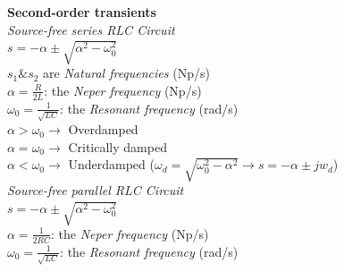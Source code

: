 \documentclass[twocolumn]{tudelft}
\begin{document}
\textbf{Second-order transients}\\
\textit{Source-free series RLC Circuit} \\
$\displaystyle s  = - \alpha \pm \sqrt{\alpha^2 - \omega_0^2}$ \\
$s_1 \& s_2$ are \textit{Natural frequencies} (\si{Np/s}) \\
$\displaystyle \alpha = \frac{R}{2L}$: the \textit{Neper frequency} (\si{Np/s}) \\
$\displaystyle \omega_0 = \frac{1}{\sqrt{LC}}$: the \textit{Resonant frequency} (\si{rad/s})\\ 
$\alpha > \omega_0 \to $ Overdamped\\
$\alpha = \omega_0 \to $ Critically damped\\
$\alpha < \omega_0 \to $ Underdamped ($\omega_d = \sqrt{\omega_0^2 - \alpha^2} \to s = -\alpha \pm jw_d$)\\

\textit{Source-free parallel RLC Circuit} \\
$\displaystyle s  = - \alpha \pm \sqrt{\alpha^2 - \omega_0^2}$ \\
$\displaystyle \alpha = \frac{1}{2RC}$: the \textit{Neper frequency} (\si{Np/s}) \\
$\displaystyle \omega_0 = \frac{1}{\sqrt{LC}}$: the \textit{Resonant frequency} (\si{rad/s})\\ 
\end{document}
